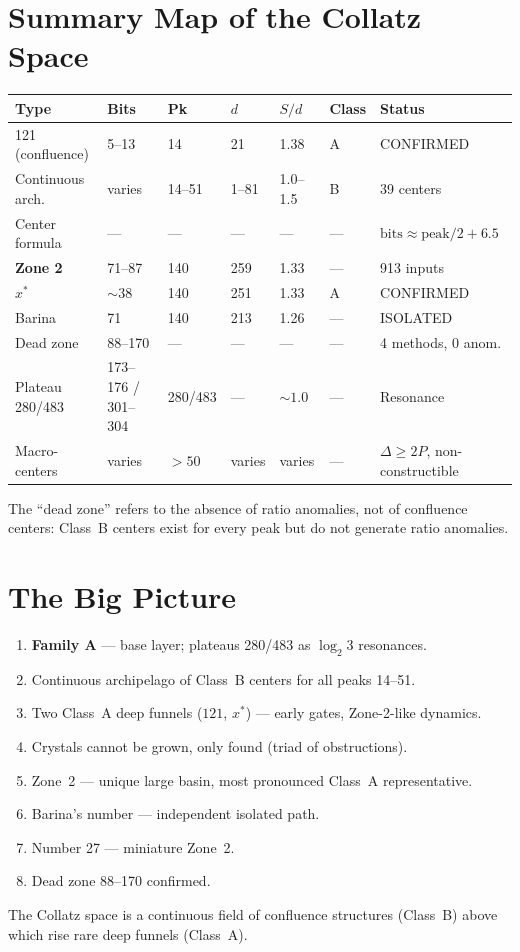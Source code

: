 \documentclass[12pt,a4paper]{article}
\theoremstyle{remark}
\begin{document}
\section{Summary Map of the Collatz Space}
{\small\sloppy
\begin{longtable}{p{2.5cm}p{1.4cm}p{0.7cm}p{0.9cm}p{0.7cm}p{2.0cm}p{2.2cm}}
\toprule
\textbf{Type} & \textbf{Bits} & \textbf{Pk} & $d$ & $S/d$ & \textbf{Class} & \textbf{Status} \\
\midrule
121 (confluence) & 5--13 & 14 & 21 & 1.38 & A & CONFIRMED \\
Continuous arch. & varies & 14--51 & 1--81 & 1.0--1.5 & B & 39 centers \\
Center formula & --- & --- & --- & --- & --- & $\mathrm{bits}\approx\mathrm{peak}/2+6.5$ \\
\textbf{Zone 2} & 71--87 & 140 & 259 & 1.33 & --- & 913 inputs \\
$x^*$ & $\sim38$ & 140 & 251 & 1.33 & A & CONFIRMED \\
Barina & 71 & 140 & 213 & 1.26 & --- & ISOLATED \\
Dead zone & 88--170 & --- & --- & --- & --- & 4 methods, 0 anom. \\
Plateau 280/483 & 173--176 / 301--304 & 280/483 & --- & $\sim1.0$ & --- & Resonance \\
Macro-centers & varies & $>50$ & varies & varies & --- & $\Delta\ge2P$, non-constructible \\
\bottomrule
\end{longtable}
}
The ``dead zone'' refers to the absence of ratio anomalies, not of confluence centers: Class~B centers exist for every peak but do not generate ratio anomalies.

\section{The Big Picture}
\begin{enumerate}
\item \textbf{Family A} --- base layer; plateaus 280/483 as $\log_2 3$ resonances.
\item Continuous archipelago of Class~B centers for all peaks 14--51.
\item Two Class~A deep funnels ($121$, $x^*$) --- early gates, Zone-2-like dynamics.
\item Crystals cannot be grown, only found (triad of obstructions).
\item Zone~2 --- unique large basin, most pronounced Class~A representative.
\item Barina's number --- independent isolated path.
\item Number 27 --- miniature Zone~2.
\item Dead zone 88--170 confirmed.
\end{enumerate}
The Collatz space is a continuous field of confluence structures (Class~B) above which rise rare deep funnels (Class~A).
\end{document}
